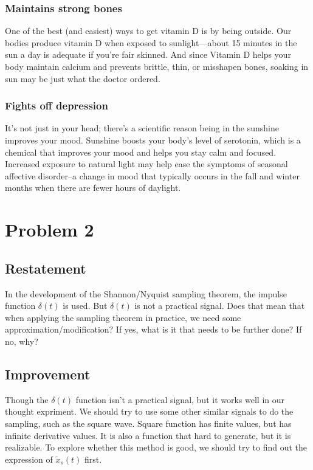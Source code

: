 \documentclass{article}
\begin{document}
\subsubsection*{Maintains strong bones}
One of the best (and easiest) ways to get vitamin D is by being outside. Our bodies produce vitamin D when exposed to sunlight—about 15 minutes in the sun a day is adequate if you’re fair skinned. And since Vitamin D helps your body maintain calcium and prevents brittle, thin, or misshapen bones, soaking in sun may be just what the doctor ordered.

\subsubsection*{Fights off depression}
It’s not just in your head; there’s a scientific reason being in the sunshine improves your mood. Sunshine boosts your body’s level of serotonin, which is a chemical that improves your mood and helps you stay calm and focused. Increased exposure to natural light may help ease the symptoms of seasonal affective disorder--a change in mood that typically occurs in the fall and winter months when there are fewer hours of daylight.


\section{Problem 2}

\subsection{Restatement}
In the development of the Shannon/Nyquist sampling theorem, the impulse function $\delta (t)$ is used. But $\delta (t)$ is not a practical signal. Does that mean that when applying the sampling theorem in practice, we need some approximation/modification? If yes, what is it that needs to be further done? If no, why?

\subsection{Improvement}

Though the $\delta (t)$ function isn't a practical signal, but it works well in our thought expriment. We should try to use some other similar signals to do the sampling, such as the square wave. Square function has finite values, but has infinite derivative values. It is also a function that hard to generate, but it is realizable. To explore whether this method is good, we should try to find out the expression of $\widetilde{x}_s(t)$ first.
\end{document}
